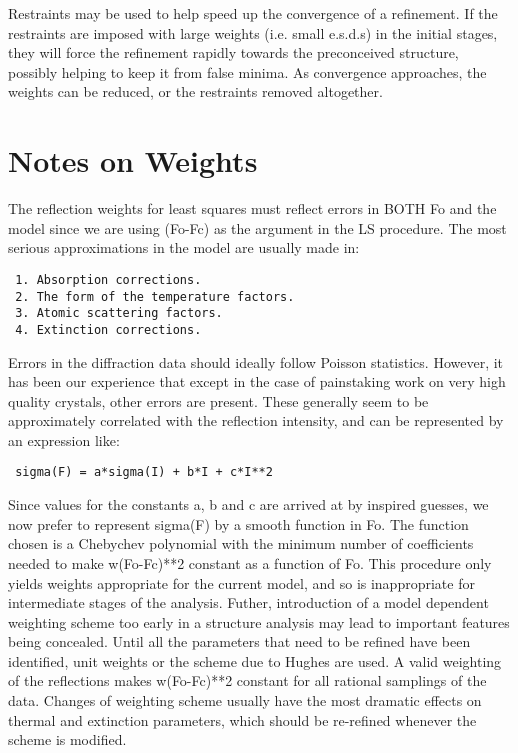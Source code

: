 \documentclass[10pt,a4paper]{report}
\begin{document}
Restraints may be used to help speed up the convergence of a refinement.
 If the restraints are imposed with large weights (i.e. small e.s.d.s)
 in the initial stages, they will force the refinement rapidly towards the 
 preconceived structure, possibly helping to keep it from false minima.
 As convergence approaches, the weights can be reduced, or the restraints 
 removed altogether. 



\section{Notes on Weights}


The reflection weights for least squares must reflect errors
 in BOTH Fo and the model since we are using (Fo-Fc) as the argument
 in the LS procedure. The most serious approximations in the model 
 are usually made in:
\small\begin{verbatim}
 1. Absorption corrections.
 2. The form of the temperature factors.
 3. Atomic scattering factors.
 4. Extinction corrections.
\end{verbatim}\normalsize




Errors in the diffraction data should ideally follow Poisson statistics.
 However, it has been our experience that except in the case of painstaking
 work on very high quality crystals, other errors are present. These generally
 seem to be approximately correlated with the reflection intensity, and can
 be represented by an expression like:
\small\begin{verbatim}
 sigma(F) = a*sigma(I) + b*I + c*I**2
\end{verbatim}\normalsize




Since values for the constants a, b and c are arrived at by inspired guesses,
 we now prefer to represent sigma(F) by a smooth function in Fo. The function
 chosen is a Chebychev polynomial with the minimum number of coefficients
 needed to make w(Fo-Fc)**2 constant as a function of Fo. This procedure
 only yields weights appropriate for the current model, and so is inappropriate
 for intermediate stages of the analysis. 
 Futher, introduction of a model dependent weighting scheme too early in a
 structure analysis may lead to important features being concealed.
 Until all the parameters that need to
 be refined have been identified, unit weights or the scheme due to Hughes are
 used. A valid weighting of the reflections makes w(Fo-Fc)**2 constant for all
 rational samplings of the data. Changes of weighting scheme usually have
 the most dramatic effects on thermal and extinction parameters, which should
 be re-refined whenever the scheme is modified.
\end{document}

